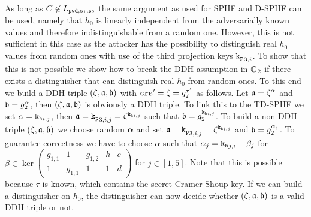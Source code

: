 As long as $C\not\in L_{\mathtt{pwd}, \mathfrak{s}_1, \mathfrak{s}_2}$ the same argument as used for \ac{SPHF} and \ac{D-SPHF} can be used, namely that $h_0$ is linearly independent from the adversarially known values and therefore indistinguishable from a random one.
However, this is not sufficient in this case as the attacker has the possibility to distinguish real $h_0$ values from random ones with use of the third projection keys $\mathtt{k_p}_{3,i}$.
To show that this is not possible we show how to break the \ac{DDH} assumption in $\mathbb{G}_2$ if there exists a distinguisher that can distinguish real $h_0$ from random ones.
To this end we build a \ac{DDH} triple $(\zeta, \mathfrak{a}, \mathfrak{b})$ with $\mathtt{crs}'=\zeta=g_2^{\tau'}$ as follows.
Let $\mathfrak{a}=\zeta^\alpha$ and $\mathfrak{b}=g_2^\alpha$, then $(\zeta, \mathfrak{a}, \mathfrak{b})$ is obviously a \ac{DDH} triple.
To link this to the \ac{TD-SPHF} we set $\alpha=\mathtt{k_h}_{i,j}$, then $\mathfrak{a}=\mathtt{k_p}_{3,i,j}=\zeta^{\mathtt{k_h}_{i,j}}$ such that $\mathfrak{b}=g_2^{\mathtt{k_h}_{i,j}}$. 
To build a non-DDH triple $(\zeta, \mathfrak{a}, \mathfrak{b})$ we choose random $\bm \alpha$ and set $\mathfrak{a}=\mathtt{k_p}_{3,i,j}=\zeta^{\mathtt{k_h}_{i,j}}$ and $\mathfrak{b}=g_2^{\alpha_{j}}$.
To guarantee correctness we have to choose $\alpha$ such that $\alpha_j=\mathtt{k_h}_{j,i}+\beta_j$ for $\beta\in\ker\begin{pmatrix}
  g_{1,1} & 1 & g_{1,2} & h & c \\
  1 & g_{1,1} & 1 & 1 & d
\end{pmatrix}$ for $j\in[1,5]$.
Note that this is possible because $\tau$ is known, which contains the secret Cramer-Shoup key.
If we can build a distinguisher on $h_0$, the distinguisher can now decide whether $(\zeta, \mathfrak{a}, \mathfrak{b})$ is a valid \ac{DDH} triple or not.


